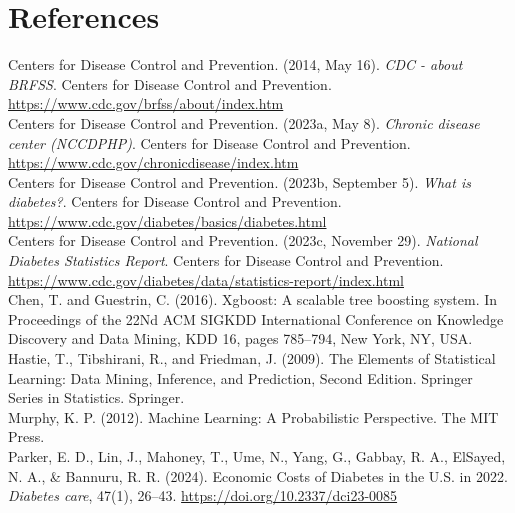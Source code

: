 \documentclass[]{article}
\begin{document}
\section{References}
\begin{hangparas}{.25in}{1}
Centers for Disease Control and Prevention. (2014, May 16). \textit{CDC - about BRFSS}. Centers for Disease Control and Prevention. \url{https://www.cdc.gov/brfss/about/index.htm} \\

Centers for Disease Control and Prevention. (2023a, May 8). \textit{Chronic disease center (NCCDPHP)}. Centers for Disease Control and Prevention. \url{https://www.cdc.gov/chronicdisease/index.htm} \\

Centers for Disease Control and Prevention. (2023b, September 5). \textit{What is diabetes?}. Centers for Disease Control and Prevention. \url{https://www.cdc.gov/diabetes/basics/diabetes.html} \\

Centers for Disease Control and Prevention. (2023c, November 29). \textit{National Diabetes Statistics Report}. Centers for Disease Control and Prevention. \url{https://www.cdc.gov/diabetes/data/statistics-report/index.html} \\

Chen, T. and Guestrin, C. (2016). Xgboost: A scalable tree boosting system. In Proceedings of the 22Nd ACM SIGKDD International Conference on Knowledge Discovery and Data Mining, KDD 16, pages 785–794, New York, NY, USA. \\

Hastie, T., Tibshirani, R., and Friedman, J. (2009). The Elements of Statistical Learning: Data Mining, Inference, and Prediction, Second Edition. Springer Series in Statistics. Springer. \\

Murphy, K. P. (2012). Machine Learning: A Probabilistic Perspective. The MIT Press. \\

Parker, E. D., Lin, J., Mahoney, T., Ume, N., Yang, G., Gabbay, R. A., ElSayed, N. A., \& Bannuru, R. R. (2024). Economic Costs of Diabetes in the U.S. in 2022. \textit{Diabetes care}, 47(1), 26–43. \url{https://doi.org/10.2337/dci23-0085} \\
\end{hangparas}
\end{document}
